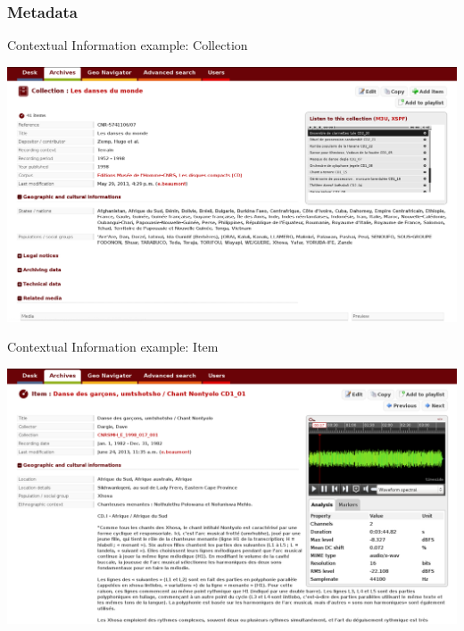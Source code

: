 \documentclass[final, hyperref, table]{beamer}
\begin{document}
\subsubsection{Metadata}
\begin{frame}[label=metadata_example]{Contextual Information example: Collection}
  \begin{center}
    \includegraphics[width=1\textwidth]{telemeta_metadata_collection.png}
  \end{center}
\href{http://archives.crem-cnrs.fr/archives/collections/CNRSMH_E_1998_017_001/}{}
 \href{./captures/Collection.html}{}
\hyperlink{telemeta_metadata}{}
\end{frame}
\begin{frame}{Contextual Information example: Item}
  \begin{center}
    \includegraphics[width=1\textwidth]{telemeta_metadata_item.png}
  \end{center}
  \href{http://archives.crem-cnrs.fr/archives/items/CNRSMH_E_1998_017_001_001_01/}{}
 \href{./captures/Item.html}{}
\hyperlink{telemeta_metadata}{}
\end{frame}
\end{document}
